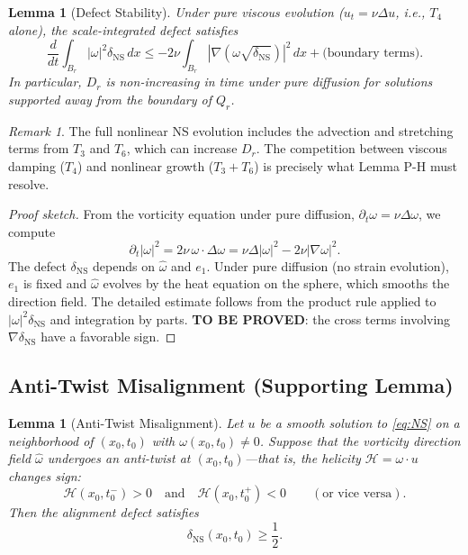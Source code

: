 \documentclass[11pt]{article}
\newtheorem{lemma}[theorem]{Lemma}
\theoremstyle{definition}
\theoremstyle{remark}
\newtheorem{remark}[theorem]{Remark}
\begin{document}
\begin{lemma}[Defect Stability]
\label{lem:monotone}
Under pure viscous evolution ($u_t = \nu\Delta u$, i.e., $T_4$ alone), the
scale-integrated defect satisfies
\begin{equation}\label{eq:D-viscous}
  \frac{d}{dt} \int_{B_r} |\omega|^2 \delta_{\mathrm{NS}}\, dx
  \leq -2\nu \int_{B_r} |\nabla(\omega\sqrt{\delta_{\mathrm{NS}}})|^2\, dx
  + \text{(boundary terms)}.
\end{equation}
In particular, $D_r$ is non-increasing in time under pure diffusion for solutions
supported away from the boundary of $Q_r$.
\end{lemma}

\begin{remark}
The full nonlinear NS evolution includes the advection and stretching terms from
$T_3$ and $T_6$, which can increase $D_r$.  The competition between viscous
damping ($T_4$) and nonlinear growth ($T_3 + T_6$) is precisely what Lemma P-H
must resolve.
\end{remark}

\begin{proof}[Proof sketch]
From the vorticity equation under pure diffusion, $\partial_t\omega = \nu\Delta\omega$,
we compute
\[
  \partial_t |\omega|^2 = 2\nu\,\omega\cdot\Delta\omega
  = \nu\Delta|\omega|^2 - 2\nu|\nabla\omega|^2.
\]
The defect $\delta_{\mathrm{NS}}$ depends on $\hat\omega$ and $e_1$.  Under pure
diffusion (no strain evolution), $e_1$ is fixed and $\hat\omega$ evolves by the heat
equation on the sphere, which smooths the direction field.  The detailed estimate
follows from the product rule applied to $|\omega|^2\delta_{\mathrm{NS}}$ and
integration by parts.  \textbf{TO BE PROVED}: the cross terms involving
$\nabla\delta_{\mathrm{NS}}$ have a favorable sign.
\end{proof}

\subsection{Anti-Twist Misalignment (Supporting Lemma)}

\begin{lemma}[Anti-Twist Misalignment]
\label{lem:anti-twist-helicity}
Let $u$ be a smooth solution to \eqref{eq:NS} on a neighborhood of $(x_0, t_0)$
with $\omega(x_0, t_0) \neq 0$.  Suppose that the vorticity direction field
$\hat\omega$ undergoes an \emph{anti-twist} at $(x_0, t_0)$---that is, the
helicity $\mathcal{H} = \omega \cdot u$ changes sign:
\begin{equation}\label{eq:anti-twist-def}
  \mathcal{H}(x_0, t_0^-) > 0 \quad \text{and} \quad
  \mathcal{H}(x_0, t_0^+) < 0
  \qquad (\text{or vice versa}).
\end{equation}
Then the alignment defect satisfies
\begin{equation}\label{eq:anti-twist-bound}
  \delta_{\mathrm{NS}}(x_0, t_0) \geq \frac{1}{2}.
\end{equation}
\end{lemma}
\end{document}
